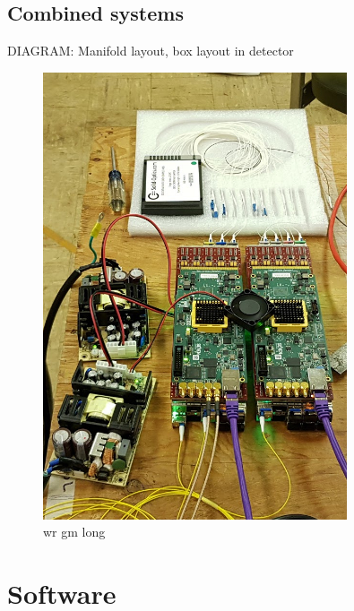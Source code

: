 \subsection{Combined systems} %
\label{sec:daq_hard_combined} %

DIAGRAM: Manifold layout, box layout in detector

\begin{figure} %
    \includegraphics[width=0.8\textwidth]{diagrams/5-daq/wr_gm.jpg}
    \caption[wr gm short]
    {wr gm long}
    \label{fig:wr_gm}
\end{figure}

\section{Software} %
\label{sec:daq_soft} %

